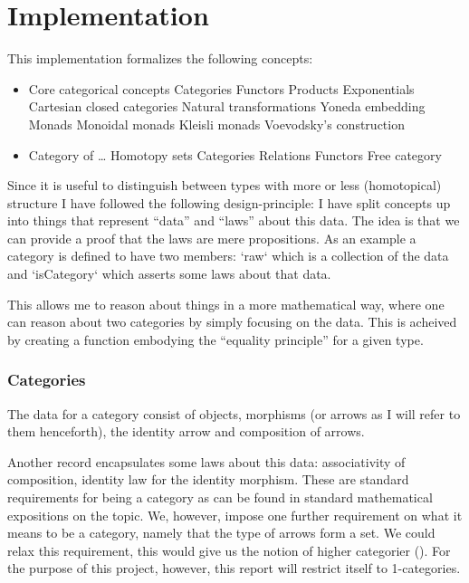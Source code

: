 \section{Implementation}
This implementation formalizes the following concepts:
%
\begin{itemize}
\item Core categorical concepts
\subitem Categories
\subitem Functors
\subitem Products
\subitem Exponentials
\subitem Cartesian closed categories
\subitem Natural transformations
\subitem Yoneda embedding
\subitem Monads
\subsubitem Monoidal monads
\subsubitem Kleisli monads
\subsubitem Voevodsky's construction
\item Category of \ldots
\subitem Homotopy sets
\subitem Categories
\subitem Relations
\subitem Functors
\subitem Free category
\end{itemize}
%
Since it is useful to distinguish between types with more or less (homotopical)
structure I have followed the following design-principle: I have split concepts
up into things that represent ``data'' and ``laws'' about this data. The idea is
that we can provide a proof that the laws are mere propositions. As an example a
category is defined to have two members: `raw` which is a collection of the data
and `isCategory` which asserts some laws about that data.

This allows me to reason about things in a more mathematical way, where one can
reason about two categories by simply focusing on the data. This is acheived by
creating a function embodying the ``equality principle'' for a given type.

\subsubsection{Categories}
The data for a category consist of objects, morphisms (or arrows as I will refer
to them henceforth), the identity arrow and composition of arrows.

Another record encapsulates some laws about this data: associativity of
composition, identity law for the identity morphism. These are standard
requirements for being a category as can be found in standard mathematical
expositions on the topic. We, however, impose one further requirement on what it
means to be a category, namely that the type of arrows form a set. We could
relax this requirement, this would give us the notion of higher categorier
(\cite[p. 307]{hott-2013}). For the purpose of this project, however, this
report will restrict itself to 1-categories.

